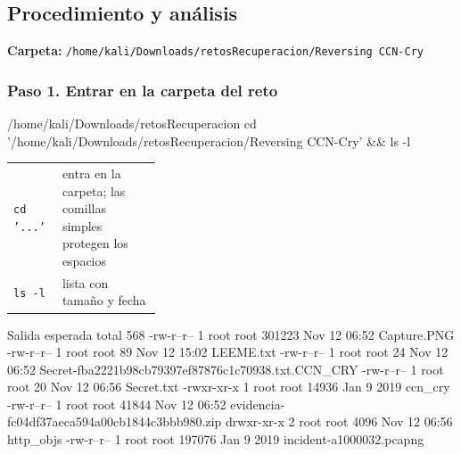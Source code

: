 \documentclass[11pt,a4paper]{article}
\begin{document}
\subsection{Procedimiento y análisis}

\noindent\textbf{Carpeta:} \texttt{/\allowbreak{}home/\allowbreak{}kali/\allowbreak{}Downloads/\allowbreak{}retosRecuperacion/\allowbreak{}Reversing CCN-Cry}


\subsubsection*{Paso 1. Entrar en la carpeta del reto}
\begin{comando}{/home/kali/Downloads/retosRecuperacion}
cd '/home/kali/Downloads/retosRecuperacion/Reversing CCN-Cry' && ls -l
\end{comando}
\begin{tcolorbox}[enhanced, breakable, colback=white, colframe=gray!40, boxrule=0.3pt, arc=1pt, left=4pt, right=4pt, top=2pt, bottom=2pt, fonttitle=\sffamily\scriptsize\bfseries, coltitle=black!75, colbacktitle=gray!8, title={Qué hace cada parte}, attach title to upper, before skip=2pt, after skip=4pt, fontupper=\small]
\par{\renewcommand{\arraystretch}{1.12}\begin{tabularx}{\linewidth}{@{}>{\raggedright\arraybackslash}p{0.33\linewidth}>{\raggedright\arraybackslash}X@{}}
\texttt{cd '...'} & entra en la carpeta; las comillas simples protegen los espacios \\
\texttt{ls -l} & lista con tamaño y fecha \\
\end{tabularx}}
\end{tcolorbox}
\begin{salidan}{Salida esperada}
total 568
-rw-r--r-- 1 root root 301223 Nov 12 06:52 Capture.PNG
-rw-r--r-- 1 root root     89 Nov 12 15:02 LEEME.txt
-rw-r--r-- 1 root root     24 Nov 12 06:52 Secret-fba2221b98cb79397ef87876c1c70938.txt.CCN_CRY
-rw-r--r-- 1 root root     20 Nov 12 06:56 Secret.txt
-rwxr-xr-x 1 root root  14936 Jan  9  2019 ccn_cry
-rw-r--r-- 1 root root  41844 Nov 12 06:52 evidencia-fc04df37aeca594a00cb1844c3bbb980.zip
drwxr-xr-x 2 root root   4096 Nov 12 06:56 http_objs
-rw-r--r-- 1 root root 197076 Jan  9  2019 incident-a1000032.pcapng
\end{salidan}
\end{document}
